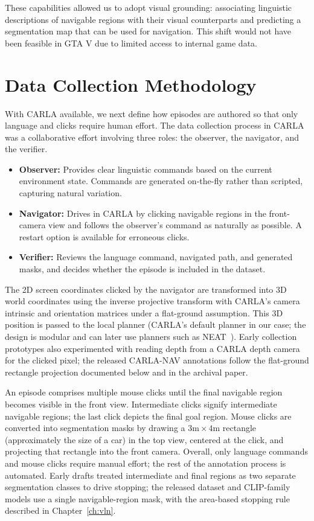 These capabilities allowed us to adopt visual grounding: associating linguistic descriptions of navigable regions with their visual counterparts and predicting a segmentation map that can be used for navigation. This shift would not have been feasible in GTA V due to limited access to internal game data.

\section{Data Collection Methodology}
\label{sec:dataset_methodology}

With CARLA available, we next define how episodes are authored so that only language and clicks require human effort. The data collection process in CARLA was a collaborative effort involving three roles: the observer, the navigator, and the verifier.

\begin{itemize}
    \item \textbf{Observer:} Provides clear linguistic commands based on the current environment state. Commands are generated on-the-fly rather than scripted, capturing natural variation.
    \item \textbf{Navigator:} Drives in CARLA by clicking navigable regions in the front-camera view and follows the observer's command as naturally as possible. A restart option is available for erroneous clicks.
    \item \textbf{Verifier:} Reviews the language command, navigated path, and generated masks, and decides whether the episode is included in the dataset.
\end{itemize}

The 2D screen coordinates clicked by the navigator are transformed into 3D world coordinates using the inverse projective transform with CARLA's camera intrinsic and orientation matrices under a flat-ground assumption. This 3D position is passed to the local planner (CARLA's default planner in our case; the design is modular and can later use planners such as NEAT~\cite{chitta2021neat}). Early collection prototypes also experimented with reading depth from a CARLA depth camera for the clicked pixel; the released CARLA-NAV annotations follow the flat-ground rectangle projection documented below and in the archival paper.

An episode comprises multiple mouse clicks until the final navigable region becomes visible in the front view. Intermediate clicks signify intermediate navigable regions; the last click depicts the final goal region. Mouse clicks are converted into segmentation masks by drawing a $3\mathrm{m} \times 4\mathrm{m}$ rectangle (approximately the size of a car) in the top view, centered at the click, and projecting that rectangle into the front camera. Overall, only language commands and mouse clicks require manual effort; the rest of the annotation process is automated. Early drafts treated intermediate and final regions as two separate segmentation classes to drive stopping; the released dataset and CLIP-family models use a single navigable-region mask, with the area-based stopping rule described in Chapter~\ref{ch:vln}.

